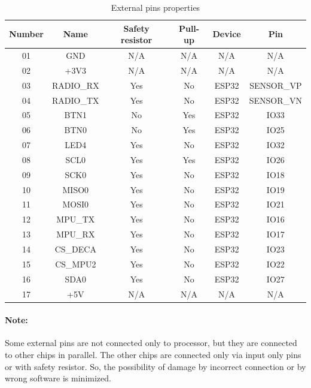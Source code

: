 \begin{table}[H]
	\centering
	\begin{tabular}{|c|c|c|c|c|c|}
		\hline
		Number & Name & Safety resistor & Pull-up & Device & Pin \\
		\hline \hline
		01 & GND & N/A & N/A & N/A & N/A \\
		02 & +3V3 & N/A & N/A & N/A & N/A \\
		03 & RADIO\_RX & Yes & No & ESP32 & SENSOR\_VP \\
		04 & RADIO\_TX & Yes & No & ESP32 & SENSOR\_VN \\
		05 & BTN1 & No & Yes & ESP32 & IO33 \\
		06 & BTN0 & No & Yes & ESP32 & IO25 \\
		07 & LED4 & Yes & No & ESP32 & IO32 \\
		08 & SCL0 & Yes & Yes & ESP32 & IO26 \\
		09 & SCK0 & Yes & No & ESP32 & IO18 \\
		10 & MISO0 & Yes & No & ESP32 & IO19 \\
		11 & MOSI0 & Yes & No & ESP32 & IO21 \\
		12 & MPU\_TX & Yes & No & ESP32 & IO16 \\
		13 & MPU\_RX & Yes & No & ESP32 & IO17 \\
		14 & CS\_DECA & Yes & No & ESP32 & IO23 \\
		15 & CS\_MPU2 & Yes & No & ESP32 & IO22 \\
		16 & SDA0 & Yes & No & ESP32 & IO27 \\
		17 & +5V & N/A & N/A & N/A & N/A \\
		\hline
	\end{tabular}
	\caption{External pins properties}
	\label{tab:externalPinsProperties}
\end{table}

\paragraph{Note:} Some external pins are not connected only to processor, but they are connected to other chips in parallel. The other chips are connected only via input only pins or with safety resistor. So, the possibility of damage by incorrect connection or by wrong software is minimized.

